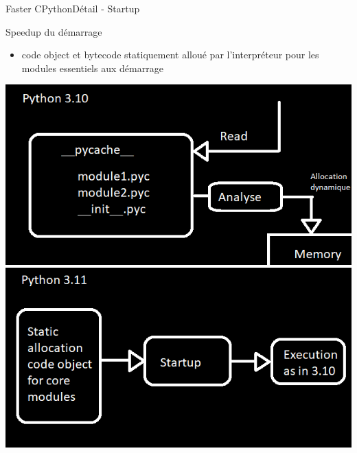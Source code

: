 \documentclass[aspectratio=169, xetex, 12pt]{beamer}
\begin{document}
    \begin{frame}{Faster CPython}{Détail - Startup}

        \begin{block}{Speedup du démarrage}
            \begin{itemize}
                \item code object et bytecode statiquement alloué par l'interpréteur
                pour les modules essentiels aux démarrage
            \end{itemize}
        \end{block}
        \includegraphics[scale=0.4]{img/workflow_startup310.png}
        \includegraphics[scale=0.4]{img/workflow_startup311.png}
    \end{frame}
\end{document}

